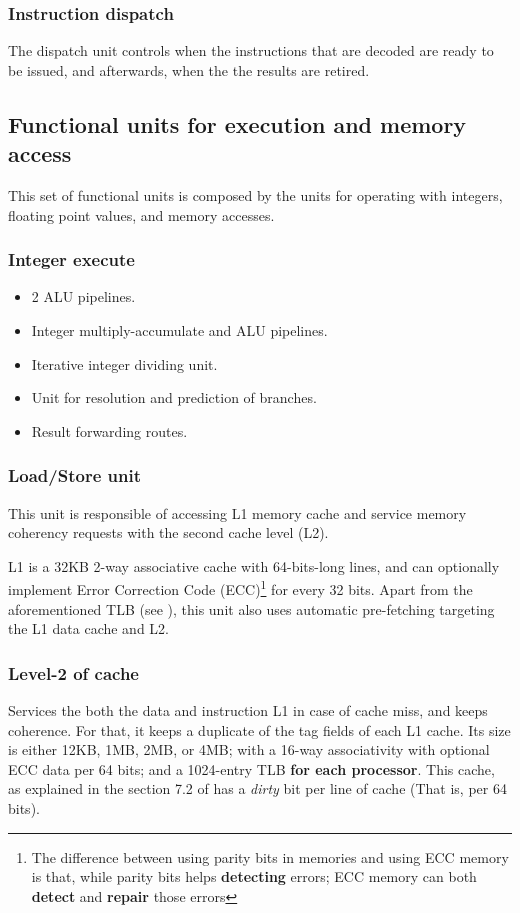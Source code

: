 \subsubsection*{Instruction dispatch}
The dispatch unit controls when the instructions that are decoded are ready to be issued, and afterwards, when the the results are retired. \cite{cortexA72manual}

\subsection*{Functional units for execution and memory access}
This set of functional units is composed by the units for operating with integers, floating point values, and memory accesses. \cite{cortexA72manual}

\subsubsection*{Integer execute}
\begin{itemize}
	\item 2 ALU pipelines.
	\item Integer multiply-accumulate and ALU pipelines.
	\item Iterative integer dividing unit.
	\item Unit for resolution and prediction of branches.
	\item Result forwarding routes.
\end{itemize}

\subsubsection*{Load/Store unit}
This unit is responsible of accessing L1 memory cache and service memory coherency requests with the second cache level (L2).

L1 is a 32KB 2-way associative cache with 64-bits-long lines, and can optionally implement Error Correction Code (ECC)\footnote{The difference between using parity bits in memories and using ECC memory is that, while parity bits helps \textbf{detecting} errors; ECC memory can both \textbf{detect} and \textbf{repair} those errors} for every 32 bits. Apart from the aforementioned TLB (see  ), this unit also uses automatic pre-fetching targeting the L1 data cache and L2. \cite{cortexA72manual}

\subsubsection*{Level-2 of cache}
Services the both the data and instruction L1 in case of cache miss, and keeps coherence. For that, it keeps a duplicate of the tag fields of each L1 cache. 
Its size is either 12KB, 1MB, 2MB, or 4MB; with a 16-way associativity with optional ECC data per 64 bits; and a 1024-entry TLB \textbf{for each processor}.
This cache, as explained in the section 7.2 of \cite{cortexA72manual} has a \textit{dirty} bit per line of cache (That is, per 64 bits).

